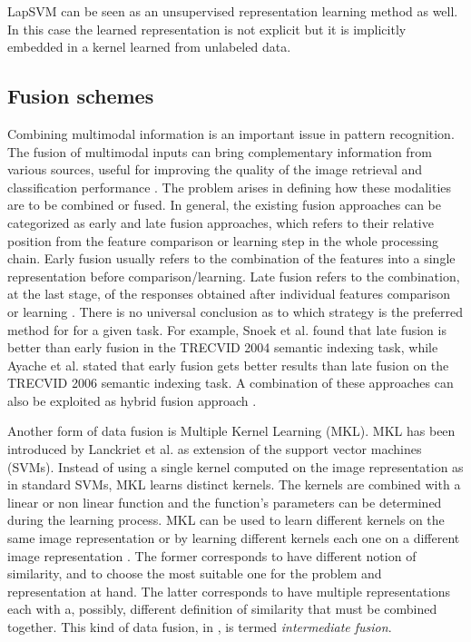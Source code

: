 \documentclass[journal,11pt]{IEEEtran}
\newcommand{\ADD}[1]{#1}
\begin{document}
LapSVM \cite{belkin2006manifold} can be seen as an unsupervised representation learning method as well. In this case the learned representation is not explicit but it is implicitly embedded in a kernel learned from unlabeled data. 

\subsection{Fusion schemes}
\ADD{
Combining multimodal information is an important issue in pattern recognition. The 
fusion of multimodal inputs can bring complementary information from various
sources, useful for improving the quality of the image retrieval and classification performance \cite{atrey2010multimodal}. The problem arises in defining how these modalities are to be 
combined or fused. In general, 
the existing fusion approaches can be categorized as early and late fusion
approaches, which refers to their relative position from the
feature comparison or learning step in the whole processing chain. Early fusion usually refers 
to the combination of the features into a single representation before comparison/learning. 
Late fusion refers to the combination, at the last stage, of the responses obtained after 
individual features comparison or learning \cite{snoek2005early,noble04}.
There is no universal conclusion as to which strategy is
the preferred method for for a given task. For example, Snoek et al. \cite{snoek2005early}
found that late fusion is better than early fusion in the TRECVID 2004 semantic
indexing task, while Ayache et al. \cite{ayache2007classifier} stated that early fusion gets better results
than late fusion on the TRECVID 2006 semantic indexing task.
A combination of these approaches can also be exploited as hybrid fusion
approach \cite{wu2005multi}.
}

\ADD{Another form of data fusion is Multiple Kernel Learning (MKL). MKL has been introduced by Lanckriet et al. \cite{lanckriet04} as extension of the support vector machines (SVMs). Instead of using a single kernel computed on the image representation as in standard SVMs, MKL learns distinct kernels. The kernels are combined with a linear or non linear function and the function's parameters can be determined during the learning process. MKL can be used to learn different kernels on the same image representation or by learning different kernels each one on a different image representation \cite{gonen2011multiple}. The former corresponds to have different notion of similarity, and to choose the most suitable one for the problem and representation at hand. The latter corresponds to have multiple representations each with a, possibly, different definition of similarity that must be combined together. This kind of data fusion, in \cite{noble04}, is termed \emph{intermediate fusion}.}
\end{document}
